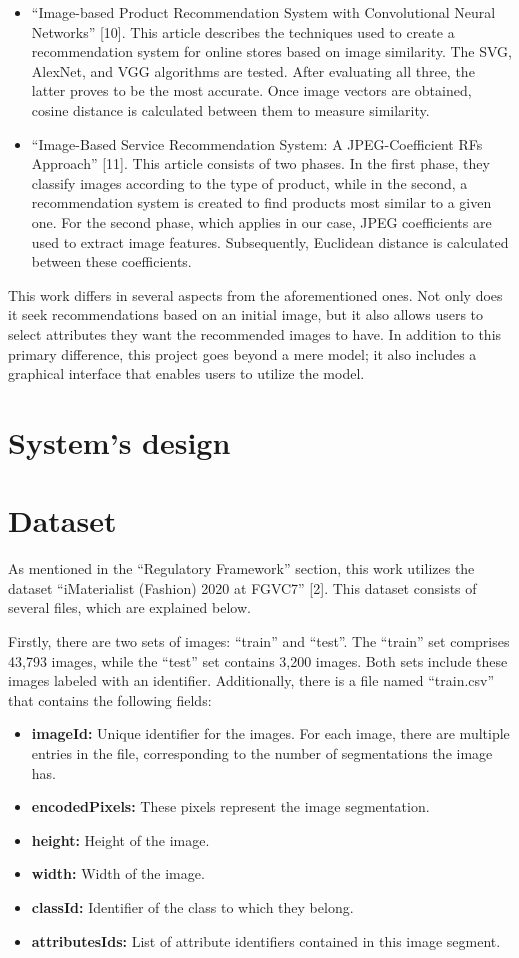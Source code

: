 \documentclass[12pt]{report} %
\begin{document}
\begin{itemize}
	\item ``Image-based Product Recommendation System with Convolutional Neural Networks'' [10]. This article describes the techniques used to create a recommendation system for online stores based on image similarity. The SVG, AlexNet, and VGG algorithms are tested. After evaluating all three, the latter proves to be the most accurate. Once image vectors are obtained, cosine distance is calculated between them to measure similarity.
	\item ``Image-Based Service Recommendation System: A JPEG-Coefficient RFs Approach'' [11]. This article consists of two phases. In the first phase, they classify images according to the type of product, while in the second, a recommendation system is created to find products most similar to a given one. For the second phase, which applies in our case, JPEG coefficients are used to extract image features. Subsequently, Euclidean distance is calculated between these coefficients.
\end{itemize}
This work differs in several aspects from the aforementioned ones. Not only does it seek recommendations based on an initial image, but it also allows users to select attributes they want the recommended images to have. In addition to this primary difference, this project goes beyond a mere model; it also includes a graphical interface that enables users to utilize the model.

\section*{System's design}
\section*{Dataset}
As mentioned in the ``Regulatory Framework'' section, this work utilizes the dataset ``iMaterialist (Fashion) 2020 at FGVC7'' [2]. This dataset consists of several files, which are explained below.

Firstly, there are two sets of images: ``train'' and ``test''. The ``train'' set comprises 43,793 images, while the ``test'' set contains 3,200 images. Both sets include these images labeled with an identifier.
Additionally, there is a file named ``train.csv'' that contains the following fields:

\begin{itemize}
	\item \textbf{imageId:} Unique identifier for the images. For each image, there are multiple entries in the file, corresponding to the number of segmentations the image has.
	\item \textbf{encodedPixels:} These pixels represent the image segmentation.
	\item \textbf{height:} Height of the image.
	\item \textbf{width:} Width of the image.
	\item \textbf{classId:} Identifier of the class to which they belong.
	\item \textbf{attributesIds:} List of attribute identifiers contained in this image segment.
\end{itemize}
\end{document}
